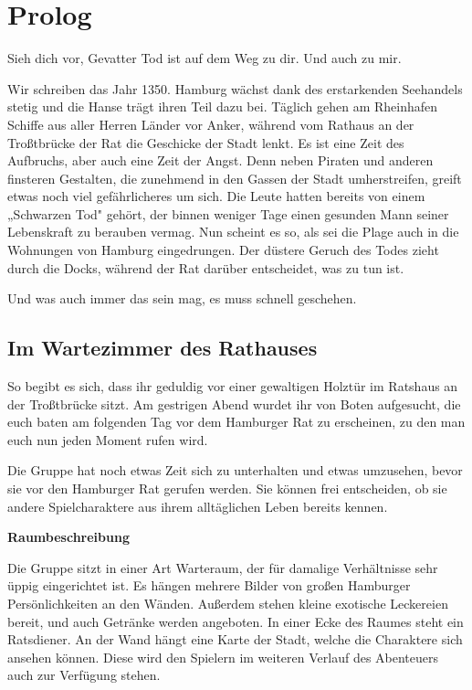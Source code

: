 
\chapter{Prolog}
\label{adventure}

\begin{advquote}
\large Sieh dich vor, Gevatter Tod ist auf dem Weg zu dir. Und auch zu mir.
\end{advquote}

Wir schreiben das Jahr 1350. Hamburg wächst dank des erstarkenden Seehandels stetig
und die Hanse trägt ihren Teil dazu bei. Täglich gehen am Rheinhafen Schiffe aus
aller Herren Länder vor Anker, während vom Rathaus an der Troßtbrücke der Rat die
Geschicke der Stadt lenkt. Es ist eine Zeit des Aufbruchs, aber auch eine Zeit der
Angst. Denn neben Piraten und anderen finsteren Gestalten, die zunehmend in den
Gassen der Stadt umherstreifen, greift etwas noch viel gefährlicheres um sich. Die
Leute hatten bereits von einem „Schwarzen Tod" gehört, der binnen weniger Tage einen
gesunden Mann seiner Lebenskraft zu berauben vermag. Nun scheint es so, als sei die
Plage auch in die Wohnungen von Hamburg eingedrungen. Der düstere Geruch des Todes
zieht durch die Docks, während der Rat darüber entscheidet, was zu tun ist.

Und was auch immer das sein mag, es muss schnell geschehen.
\vspace{0.7cm}

\section{Im Wartezimmer des Rathauses}
\label{sec:wartezimmer}

So begibt es sich, dass ihr geduldig vor einer gewaltigen Holztür im Ratshaus an der
Troßtbrücke sitzt. Am gestrigen Abend wurdet ihr von Boten aufgesucht, die euch baten
am folgenden Tag vor dem Hamburger Rat zu erscheinen, zu den man euch nun jeden
Moment rufen wird. \vspace{0.3cm}

\begin{tcolorbox}
Die Gruppe hat noch etwas Zeit sich zu unterhalten und etwas umzusehen, bevor sie vor
den Hamburger Rat gerufen werden. Sie können frei entscheiden, ob sie andere
Spielcharaktere aus ihrem alltäglichen Leben bereits kennen.

\vspace{0.7cm}
\centering\textbf{Raumbeschreibung}

\flushleft
Die Gruppe sitzt in einer Art Warteraum, der für damalige Verhältnisse sehr üppig
eingerichtet ist. Es hängen mehrere Bilder von großen Hamburger Persönlichkeiten an
den Wänden. Außerdem stehen kleine exotische Leckereien bereit, und auch Getränke
werden angeboten. In einer Ecke des Raumes steht ein Ratsdiener. An der Wand hängt
eine Karte der Stadt, welche die Charaktere sich ansehen können. Diese wird den
Spielern im weiteren Verlauf des Abenteuers auch zur Verfügung stehen.
\end{tcolorbox}

